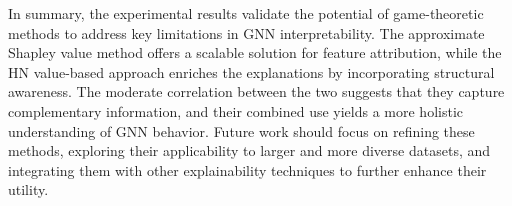 \documentclass{article}
\begin{document}
In summary, the experimental results validate the potential of game-theoretic methods to address key limitations in GNN interpretability. The approximate Shapley value method offers a scalable solution for feature attribution, while the HN value-based approach enriches the explanations by incorporating structural awareness. The moderate correlation between the two suggests that they capture complementary information, and their combined use yields a more holistic understanding of GNN behavior. Future work should focus on refining these methods, exploring their applicability to larger and more diverse datasets, and integrating them with other explainability techniques to further enhance their utility.
\end{document}
